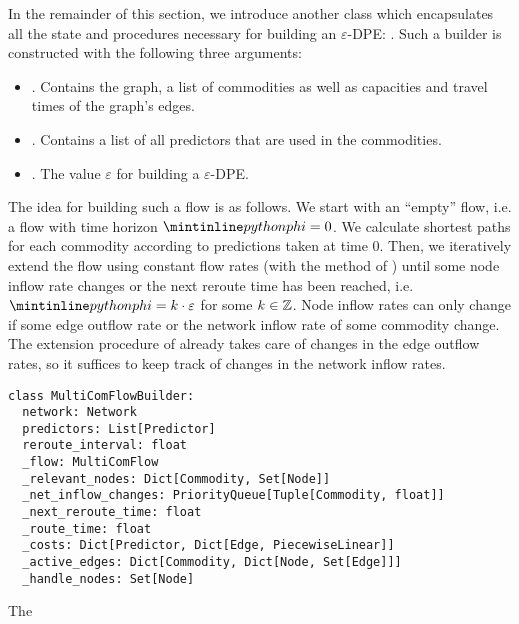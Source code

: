 In the remainder of this section, we introduce another class which encapsulates all the state and procedures necessary for building an $\varepsilon$-DPE: .
Such a builder is constructed with the following three arguments:
\begin{itemize}
  \item {}. Contains the graph, a list of commodities as well as capacities and travel times of the graph's edges.
  \item {}. Contains a list of all predictors that are used in the commodities.
  \item {}. The value $\varepsilon$ for building a $\varepsilon$-DPE. 
\end{itemize}

The idea for building such a flow is as follows.
We start with an ``empty'' flow, i.e. a flow with time horizon $\code{phi}=0$.
We calculate shortest paths for each commodity according to predictions taken at time $0$.
Then, we iteratively extend the flow using constant flow rates (with the  method of )
until some node inflow rate changes or the next reroute time has been reached, i.e. $\code{phi} = k\cdot \varepsilon$ for some $k\in \mathbb{Z}$.
Node inflow rates can only change if some edge outflow rate or the network inflow rate of some commodity change.
The extension procedure of  already takes care of changes in the edge outflow rates, so it suffices to keep track of changes in the network inflow rates.  

\begin{classdef}
  \begin{verbatim}
class MultiComFlowBuilder:
  network: Network
  predictors: List[Predictor]
  reroute_interval: float
  _flow: MultiComFlow
  _relevant_nodes: Dict[Commodity, Set[Node]]
  _net_inflow_changes: PriorityQueue[Tuple[Commodity, float]]
  _next_reroute_time: float
  _route_time: float
  _costs: Dict[Predictor, Dict[Edge, PiecewiseLinear]]
  _active_edges: Dict[Commodity, Dict[Node, Set[Edge]]]
  _handle_nodes: Set[Node]
\end{verbatim}
    \caption{The }%
    \label{data:multi-com-flow-builder}
\end{classdef}

